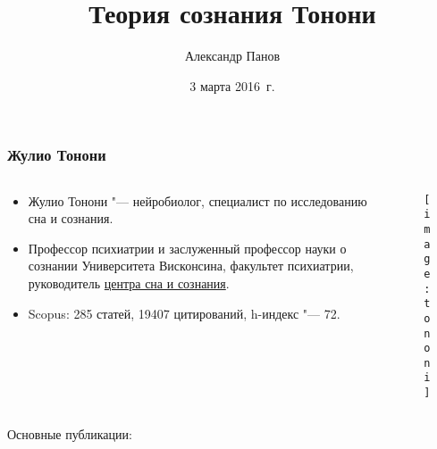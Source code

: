 \documentclass[default]{beamer}
\begin{document}
	
	\title[Semiotic schemas]{Теория сознания Тонони}
	\author[Панов]{Александр Панов}
	\date{3 марта 2016~г.} 
	
	\begin{frame}
		\titlepage
	\end{frame}
	
	\begin{frame}
		\frametitle{Жулио Тонони}
		
		\footnotesize
		\begin{columns}
			\begin{column}{0.8\textwidth}
				\begin{itemize}
					\item Жулио Тонони "--- нейробиолог, специалист по исследованию сна и сознания.
					\item Профессор психиатрии и заслуженный профессор науки о сознании Университета Висконсина, факультет психиатрии, руководитель \href{http://centerforsleepandconsciousness.med.wisc.edu/people/tononi.html}{центра сна и сознания}.
					\item Scopus: 285 статей, 19407 цитирований, h-индекс "--- 72.
				\end{itemize}
			\end{column}
			\begin{column}{0.2\textwidth}
				\begin{figure}
					\texttt{[image: tononi]}
				\end{figure}
			\end{column}
		\end{columns}
		Основные публикации:
		\nocite{*}
		\printbibliography[keyword={tononi}]
		
	
	\end{frame}
	
\end{document}
